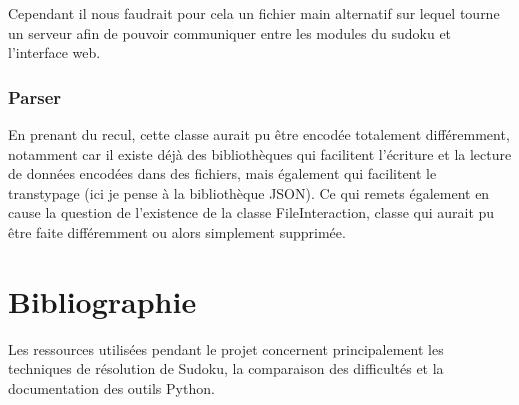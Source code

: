\documentclass[a4paper]{article}
\begin{document}
Cependant il nous faudrait pour cela un fichier main alternatif sur lequel tourne un serveur afin de pouvoir communiquer entre les modules du sudoku et l'interface web.

\subsubsection{Parser}
En prenant du recul, cette classe aurait pu être encodée totalement différemment, notamment car il existe déjà des bibliothèques qui facilitent l'écriture et la lecture de données encodées dans des fichiers, mais également qui facilitent le transtypage (ici je pense à la bibliothèque JSON). Ce qui remets également en cause la question de l'existence de la classe FileInteraction, classe qui aurait pu être faite différemment ou alors simplement supprimée.

\vspace{0.5cm}

\section{Bibliographie}

Les ressources utilisées pendant le projet concernent principalement les techniques de résolution de Sudoku, la comparaison des difficultés et la documentation des outils Python.
\end{document}
